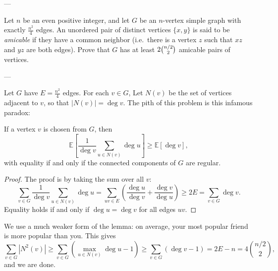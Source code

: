 
---

Let $n$ be an even positive integer, and let $G$ be an $n$-vertex simple graph with exactly $\tfrac{n^2}{4}$ edges. An unordered pair of distinct vertices $\{x,y\}$ is said to be \emph{amicable} if they have a common neighbor (i.e.\ there is a vertex $z$ such that $xz$ and $yz$ are both edges). Prove that $G$ has at least $2\tbinom{n/2}{2}$ amicable pairs of vertices.

---

Let $G$ have $E=\tfrac{n^2}4$ edges. For each $v\in G$, Let $N(v)$ be the set of vertices adjacent to $v$, so that $|N(v)|=\deg v$. The pith of this problem is this infamous paradox:
\begin{boxlemma*}
    If a vertex $v$ is chosen from $G$, then \[\mathbb E\left[\frac1{\deg v}\sum_{u\in N(v)}\deg u\right]\ge\mathbb E[\deg v],\]
    with equality if and only if the connected components of $G$ are regular.
\end{boxlemma*}
\begin{proof}
    The proof is by taking the sum over all $v$: \[\sum_{v\in G}\frac1{\deg v}\sum_{u\in N(v)}\deg u=\sum_{uv\in E}\left(\frac{\deg u}{\deg v}+\frac{\deg v}{\deg u}\right)\ge 2E=\sum_{v\in G}\deg v.\]
    Equality holds if and only if $\deg u=\deg v$ for all edges $uv$.
\end{proof}

We use a much weaker form of the lemma: on average, your most popular friend is more popular than you. This gives \[\sum_{v\in G}\left\lvert N^2(v)\right\rvert\ge\sum_{v\in G}\left(\max_{u\in N(v)}\deg u-1\right)\ge\sum_{v\in G}(\deg v-1)=2E-n=4\binom{n/2}2,\]
and we are done.

